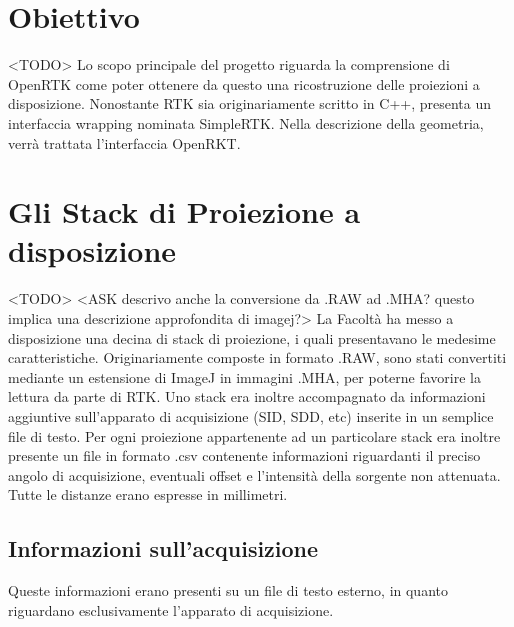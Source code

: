 \documentclass[a4paper,12pt, doubleside]{report}
\begin{document}
        \section{Obiettivo}
            <TODO>
            Lo scopo principale del progetto riguarda la comprensione di OpenRTK come poter ottenere da questo una ricostruzione delle proiezioni a disposizione.
            Nonostante RTK sia originariamente scritto in C++, presenta un interfaccia wrapping nominata SimpleRTK. Nella descrizione della geometria, verrà trattata l'interfaccia OpenRKT.
         
        \section{Gli Stack di Proiezione a disposizione}
            <TODO>
            <ASK descrivo anche la conversione da .RAW ad .MHA? questo implica una descrizione approfondita di imagej?>
            La Facoltà ha messo a disposizione una decina di stack di proiezione, i quali presentavano le medesime caratteristiche. Originariamente composte in formato .RAW, sono stati convertiti mediante un estensione di ImageJ in immagini .MHA, per poterne favorire la lettura da parte di RTK. Uno stack era inoltre accompagnato da informazioni aggiuntive sull'apparato di acquisizione (SID, SDD, etc) inserite in un semplice file di testo. Per ogni proiezione appartenente ad un particolare stack era inoltre presente un file in formato .csv contenente informazioni riguardanti il preciso angolo di acquisizione, eventuali offset e l'intensità della sorgente non attenuata.
            Tutte le distanze erano espresse in millimetri.
            
            \subsection{Informazioni sull'acquisizione}
                \label{sub:acq_file}
                \par
                    Queste informazioni erano presenti su un file di testo esterno, in quanto riguardano esclusivamente l'apparato di acquisizione. 
                    
\end{document}
